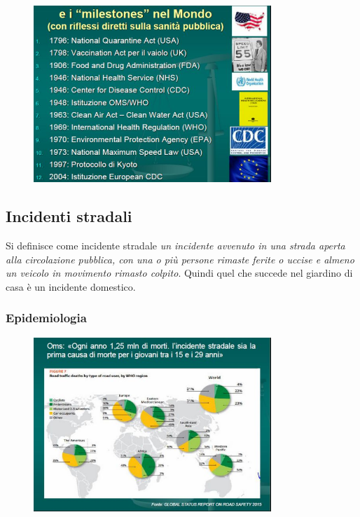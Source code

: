 \begin{figure}[!ht]
\centering
	\includegraphics[width=0.8\textwidth]{28/image3.jpg}
	\end{figure}
	
\subsection{Incidenti stradali}

Si definisce come incidente stradale \emph{un incidente avvenuto in una
strada aperta alla circolazione pubblica, con una o più persone rimaste
ferite o uccise e almeno un veicolo in movimento rimasto colpito}.
Quindi quel che succede nel giardino di casa è un incidente domestico.

\subsubsection{Epidemiologia}

\begin{figure}[!ht]
\centering
	\includegraphics[width=0.8\textwidth]{28/image4.jpg}
	\end{figure}
	
